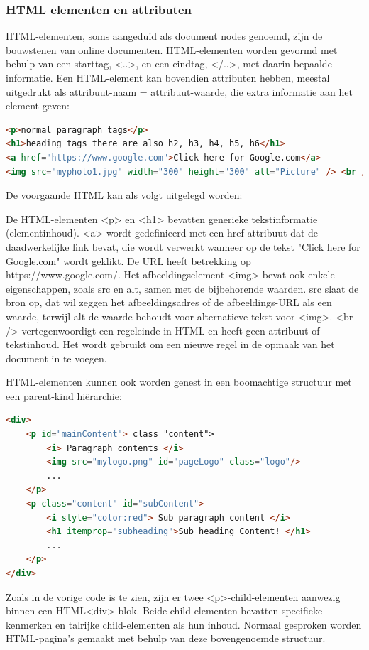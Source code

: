 \subsubsection{HTML elementen en attributen}
HTML-elementen, soms aangeduid als document nodes genoemd, zijn de bouwstenen van online documenten. 
HTML-elementen worden gevormd met behulp van een starttag, <..>, en een eindtag, </..>, met daarin bepaalde informatie. 
Een HTML-element kan bovendien attributen hebben, meestal uitgedrukt als attribuut-naam = attribuut-waarde, die extra informatie aan het element geven:
\begin{lstlisting}[language=HTML, caption=HTML element voorbeeld]
<p>normal paragraph tags</p>
<h1>heading tags there are also h2, h3, h4, h5, h6</h1>
<a href="https://www.google.com">Click here for Google.com</a>
<img src="myphoto1.jpg" width="300" height="300" alt="Picture" /> <br />
\end{lstlisting}
De voorgaande HTML kan als volgt uitgelegd worden:

De HTML-elementen <p> en <h1> bevatten generieke tekstinformatie (elementinhoud).
<a> wordt gedefinieerd met een href-attribuut dat de daadwerkelijke link bevat, die wordt verwerkt wanneer op de tekst "Click here for Google.com" wordt geklikt. De URL heeft betrekking op https://www.google.com/.
Het afbeeldingselement <img> bevat ook enkele eigenschappen, zoals src en alt, samen met de bijbehorende waarden. src slaat de bron op, dat wil zeggen het afbeeldingsadres of de afbeeldings-URL als een waarde, terwijl alt de waarde behoudt voor alternatieve tekst voor <img>.
<br /> vertegenwoordigt een regeleinde in HTML en heeft geen attribuut of tekstinhoud. Het wordt gebruikt om een nieuwe regel in de opmaak van het document in te voegen.

HTML-elementen kunnen ook worden genest in een boomachtige structuur met een parent-kind hiërarchie:
\begin{lstlisting}[language=HTML, caption=HTML-element nesting voorbeeld]
<div>
	<p id="mainContent"> class "content">
		<i> Paragraph contents </i>
		<img src="mylogo.png" id="pageLogo" class="logo"/>
		...
	</p>
	<p class="content" id="subContent">
		<i style="color:red"> Sub paragraph content </i>
		<h1 itemprop="subheading">Sub heading Content! </h1>
		...
	</p>
</div>
\end{lstlisting}
Zoals in de vorige code is te zien, zijn er twee <p>-child-elementen aanwezig binnen een HTML<div>-blok. 
Beide child-elementen bevatten specifieke kenmerken en talrijke child-elementen als hun inhoud. Normaal gesproken worden HTML-pagina's gemaakt met behulp van deze bovengenoemde structuur.\autocite{chapagain2019hands}

